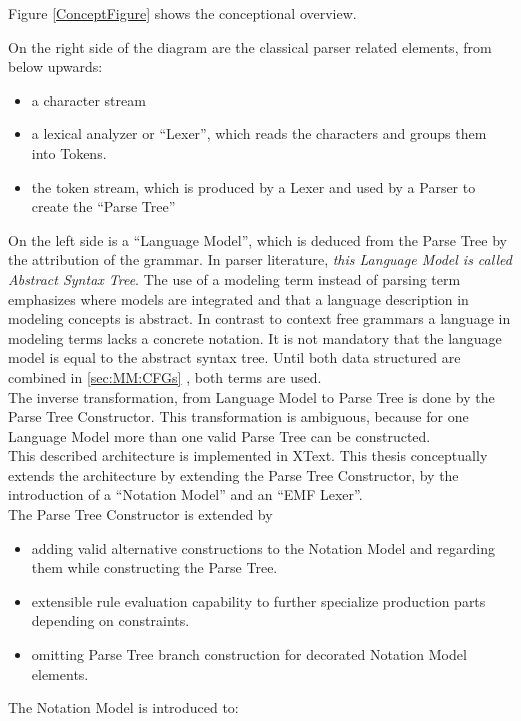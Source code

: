 Figure \ref{ConceptFigure} shows the conceptional overview. 

On the right side of the diagram are the classical parser related elements, from below upwards:
\begin{itemize}
	\item a character stream
	\item a lexical analyzer or ``Lexer'', which reads the characters and groups them into Tokens.
	\item the token stream, which is produced by a Lexer and used by a Parser to create the ``Parse Tree''
\end{itemize}

On the left side is a ``Language Model'', which is deduced from the Parse Tree by the attribution of the grammar. In parser literature, \emph{this Language Model is called Abstract Syntax Tree}. The use of a modeling term instead of parsing term emphasizes where models are integrated and that a language description in modeling concepts is abstract. In contrast to context free grammars a language in modeling terms lacks a concrete notation. It is not mandatory that the language model is equal to the abstract syntax tree. Until both data structured are combined in \ref{sec:MM:CFGs} , both terms are used. \\
The inverse transformation, from Language Model to Parse Tree is done by the Parse Tree Constructor. This transformation is ambiguous, because for one Language Model more than one valid Parse Tree can be constructed. \\
This described architecture is implemented in XText. This thesis conceptually extends the architecture by extending the Parse Tree Constructor, by the introduction of a ``Notation Model'' and an ``EMF Lexer''.\\
The Parse Tree Constructor is extended by 
\begin{itemize}
	\item adding valid alternative constructions to the Notation Model and regarding them while constructing the Parse Tree. 
	\item extensible rule evaluation capability to further specialize production parts depending on constraints.
	\item omitting Parse Tree branch construction for decorated Notation Model elements.
\end{itemize}
The Notation Model is introduced to:
